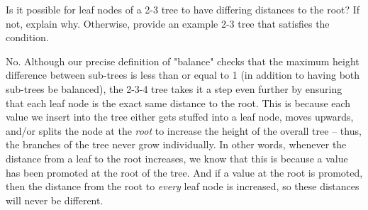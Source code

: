 \begin{blocksection}
\begin{parts}
\item Is it possible for leaf nodes of a 2-3 tree to have differing distances to the root? If not, explain why. Otherwise, provide an example 2-3 tree that satisfies the condition.

\begin{solution}[2in]
No. Although our precise definition of "balance" checks that the maximum height difference between sub-trees is less than or equal to 1 (in addition to having both sub-trees be balanced), the 2-3-4 tree takes it a step even further by ensuring that each leaf node is the exact same distance to the root. This is because each value we insert into the tree either gets stuffed into a leaf node, moves upwards, and/or splits the node at the \textit{root} to increase the height of the overall tree -- thus, the branches of the tree never grow individually. In other words, whenever the distance from a leaf to the root increases, we know that this is because a value has been promoted at the root of the tree. And if a value at the root is promoted, then the distance from the root to \textit{every} leaf node is increased, so these distances will never be different.

\end{solution}

\end{parts}

\end{blocksection}
